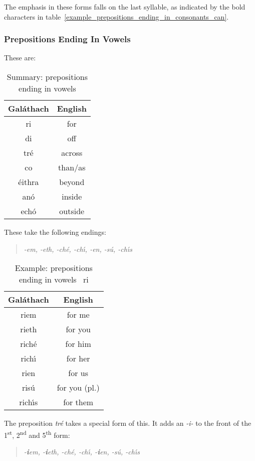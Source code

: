 The emphasis in these forms falls on the last syllable, as indicated by the bold characters in table~\ref{example_prepositions_ending_in_consonants_can}.

\subsubsection{Prepositions Ending In Vowels}

These are:
\begin{table}[H]
\centering
\begin{tabular}{c|c}
  \textbf{Gal\'{a}thach} & \textbf{English}\\
  \toprule
  ri & for\\
  di & off\\
  tr\'{e} & across\\
  co & than/as\\
  \'{e}ithra & beyond\\
  an\'{o} & inside\\
  ech\'{o} & outside
\end{tabular}
\caption{Summary: prepositions ending in vowels}
\label{summary_prepositions_ending_in_vowels}
\end{table}

These take the following endings:
\begin{quote}
\textit{-em, -eth, -ch\'{e}, -ch\'{\i}, -en, -s\'{u}, -ch\'{\i}s}
\end{quote}

\begin{table}[H]
\centering
\begin{tabular}{c|c}
  \textbf{Gal\'{a}thach} & \textbf{English}\\
  \toprule
  riem & for me\\
  rieth & for you\\
  rich\'{e} & for him\\
  rich\'{\i} & for her\\
  rien & for us\\
  ris\'{u} & for you (pl.)\\
  rich\'{\i}s & for them
\end{tabular}
\caption{Example: prepositions ending in vowels \textendash\ ri}
\label{example_prepositions_ending_in_vowels_ri}
\end{table}

The preposition \textit{tr\'{e}} takes a special form of this. It adds an \textit{-i-} to the front of the 1\textsuperscript{st}, 2\textsuperscript{nd} and 5\textsuperscript{th} form:
\begin{quote}
\textit{-\textbf{i}em, -\textbf{i}eth, -ch\'{e}, -ch\'{\i}, -\textbf{i}en, -s\'{u}, -ch\'{\i}s}
\end{quote}

